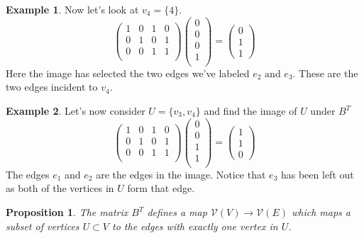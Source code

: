 \documentclass[10pt, letterpaper]{article}
\newtheorem{prop}{Proposition}
\theoremstyle{remark}
\theoremstyle{definition}
\newtheorem{ex}{Example}
\begin{document}
\begin{ex}
	Now let's look at $v_4 = \{4\}$.
	\[
		\begin{pmatrix}
			1 & 0 & 1 & 0 \\
			0 & 1 & 0 & 1 \\
			0 & 0 & 1 & 1 \\
		\end{pmatrix}
		\begin{pmatrix}
			0 \\ 0 \\ 0 \\ 1 \\
		\end{pmatrix} = 
		\begin{pmatrix}
			0 \\ 1 \\ 1 
		\end{pmatrix}
	\]
	Here the image has selected the two edges we've labeled $e_2 \text{ and } e_3$. These are the two edges incident to $v_4$.
\end{ex}

\begin{ex}
	Let's now consider $U = \{v_3,v_4\}$ and find the image of $U$ under $B^T$
	\[
		\begin{pmatrix}
			1 & 0 & 1 & 0 \\
			0 & 1 & 0 & 1 \\
			0 & 0 & 1 & 1 \\
		\end{pmatrix}
		\begin{pmatrix}
			0 \\ 0 \\ 1 \\ 1 \\
		\end{pmatrix} = 
		\begin{pmatrix}
			1 \\ 1 \\ 0 
		\end{pmatrix}
	\]
	The edges $e_1$ and $e_2$ are the edges in the image. Notice that $e_3$ has been left out as both of the vertices in $U$ form that edge.
\end{ex}

\begin{prop}
	The matrix $B^T$ defines a map $\mathcal{V}(V) \rightarrow \mathcal{V}(E)$ which maps a subset of vertices $U \subset V$ to the edges with exactly one vertex in $U$.
\end{prop}
\end{document}
